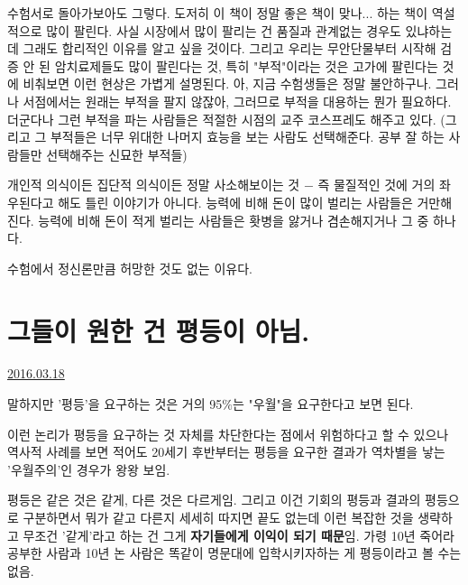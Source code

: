 수험서로 돌아가보아도 그렇다. 도저히 이 책이 정말 좋은 책이 맞나... 하는 책이 역설적으로 많이 팔린다.
사실 시장에서 많이 팔리는 건 품질과 관계없는 경우도 있냐하는데 그래도 합리적인 이유를 알고 싶을 것이다.
그리고 우리는 무안단물부터 시작해 검증 안 된 암치료제들도 많이 팔린다는 것,
특히 "부적"이라는 것은 고가에 팔린다는 것에 비춰보면 이런 현상은 가볍게 설명된다.
아, 지금 수험생들은 정말 불안하구나. 그러나 서점에서는 원래는 부적을 팔지 않잖아,
그러므로 부적을 대용하는 뭔가 필요하다. 더군다나 그런 부적을 파는 사람들은 적절한 시점의 교주 코스프레도 해주고 있다.
(그리고 그 부적들은 너무 위대한 나머지 효능을 보는 사람도 선택해준다. 공부 잘 하는 사람들만 선택해주는 신묘한 부적들)
\vspace{5mm}

개인적 의식이든 집단적 의식이든 정말 사소해보이는 것 $-$ 즉 물질적인 것에 거의 좌우된다고 해도 틀린 이야기가 아니다.
능력에 비해 돈이 많이 벌리는 사람들은 거만해진다.
능력에 비해 돈이 적게 벌리는 사람들은 홧병을 앓거나 겸손해지거나 그 중 하나다.
\vspace{5mm}

수험에서 정신론만큼 허망한 것도 없는 이유다.
\vspace{5mm}






\section{그들이 원한 건 평등이 아님.}
\href{https://www.kockoc.com/Apoc/681774}{2016.03.18}

\vspace{5mm}

말하지만 '평등'을 요구하는 것은 거의 95$\%$는 "우월"을 요구한다고 보면 된다.
\vspace{5mm}

이런 논리가 평등을 요구하는 것 자체를 차단한다는 점에서 위험하다고 할 수 있으나
역사적 사례를 보면 적어도 20세기 후반부터는 평등을 요구한 결과가 역차별을 낳는 '우월주의'인 경우가 왕왕 보임.
\vspace{5mm}

평등은 같은 것은 같게, 다른 것은 다르게임.
그리고 이건 기회의 평등과 결과의 평등으로 구분하면서 뭐가 같고 다른지 세세히 따지면 끝도 없는데
이런 복잡한 것을 생략하고 무조건 '같게'라고 하는 건 그게 \textbf{자기들에게 이익이 되기 때문}임.
가령 10년 죽어라 공부한 사람과 10년 논 사람은 똑같이 명문대에 입학시키자하는 게 평등이라고 볼 수는 없음.
\vspace{5mm}

